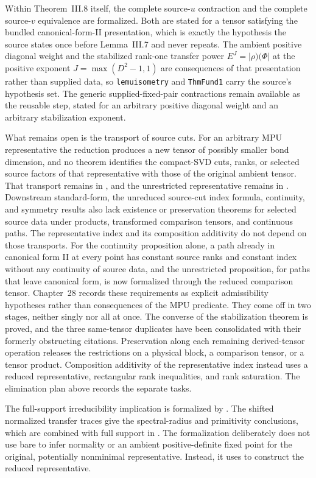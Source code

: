 \documentclass{article}
\begin{document}
Within Theorem~III.8 itself, the complete source-$u$ contraction and the
complete source-$v$ equivalence are formalized. Both are stated for a tensor
satisfying the bundled canonical-form-II presentation, which is exactly the
hypothesis the source states once before Lemma~III.7 and never repeats. The
ambient positive diagonal weight and the stabilized rank-one transfer power
$E^{J}=\lvert\rho)(\Phi\rvert$ at the positive exponent $J=\max(D^2-1,1)$ are
consequences of that presentation rather than supplied data, so
\texttt{lemuisometry} and \texttt{ThmFund1} carry the source's hypothesis set.
The generic supplied-fixed-pair contractions remain available as the reusable
step, stated for an arbitrary positive diagonal weight and an arbitrary
stabilization exponent.

What remains open is the transport of source cuts. For an arbitrary MPU
representative the reduction produces a new tensor of possibly smaller bond
dimension, and no theorem identifies the compact-SVD cuts, ranks, or selected
source factors of that representative with those of the original ambient
tensor. That transport remains in , and the unrestricted
representative remains in . Downstream standard-form, the
unreduced source-cut index formula, continuity, and symmetry results also lack
existence or preservation theorems for selected source data under products,
transformed comparison tensors, and continuous paths. The representative
index and its composition additivity do not depend on those transports. For
the continuity proposition alone, a path already in canonical form II at every
point has constant source ranks and constant index without any continuity of
source data, and the unrestricted proposition, for paths that leave canonical
form, is now formalized through the reduced comparison tensor.
Chapter~28 records these requirements as explicit admissibility hypotheses
rather than consequences of the MPU predicate. They come off in two stages,
neither singly nor all at once. The converse of the stabilization theorem is
proved, and the three same-tensor duplicates have been consolidated with
their formerly obstructing citations. Preservation along each remaining
derived-tensor operation releases the restrictions on a physical block, a
comparison tensor, or a tensor product. Composition additivity of the
representative index instead uses a reduced representative, rectangular rank
inequalities, and rank saturation. The elimination plan above records the
separate tasks.

The full-support irreducibility implication is formalized by
.
The shifted normalized transfer traces give the spectral-radius and primitivity
conclusions, which are combined with full support in
.
The formalization deliberately does not use bare
 to infer normality or an ambient positive-definite
fixed point for the original, potentially nonminimal representative. Instead,
it uses
 to construct the
reduced representative.



\end{document}

